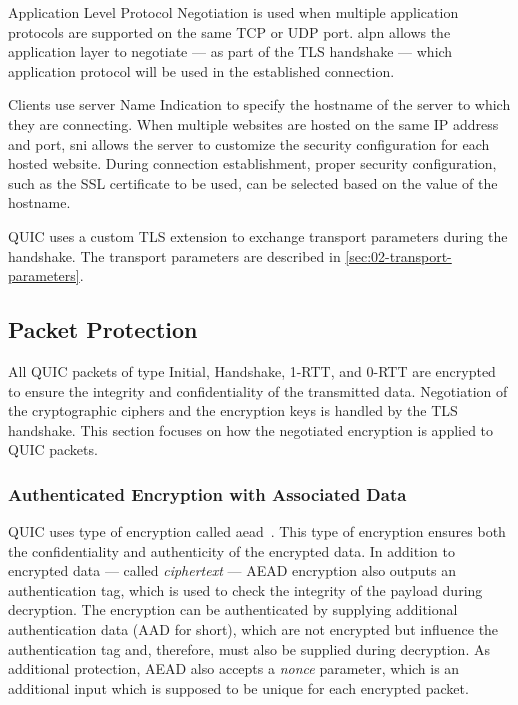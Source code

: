 Application Level Protocol Negotiation is used when multiple application protocols are supported on
the same TCP or UDP port. \Gls{alpn} allows the application layer to negotiate --- as part of the TLS
handshake --- which application protocol will be used in the established connection.

Clients use server Name Indication to specify the hostname of the server to which they are
connecting. When multiple websites are hosted on the same IP address and port, \gls{sni} allows the
server to customize the security configuration for each hosted website. During connection
establishment, proper security configuration, such as the SSL certificate to be used, can be
selected based on the value of the hostname.

QUIC uses a custom TLS extension to exchange transport parameters during the handshake. The
transport parameters are described in \autoref{sec:02-transport-parameters}.

\subsection{Packet Protection}\label{sec:02-packet-protection}

All QUIC packets of type Initial, Handshake, 1-RTT, and 0-RTT are encrypted to ensure the integrity
and confidentiality of the transmitted data. Negotiation of the cryptographic ciphers and the
encryption keys is handled by the TLS handshake. This section focuses on how the negotiated
encryption is applied to QUIC packets.

\subsubsection{Authenticated Encryption with Associated Data}

QUIC uses type of encryption called \gls{aead}~\cite{rfc5116}. This type of encryption ensures both
the confidentiality and authenticity of the encrypted data. In addition to encrypted data --- called
\textit{ciphertext} --- AEAD encryption also outputs an authentication tag, which is used to check
the integrity of the payload during decryption. The encryption can be authenticated by supplying
additional authentication data (AAD for short), which are not encrypted but influence the
authentication tag and, therefore, must also be supplied during decryption. As additional
protection, AEAD also accepts a \textit{nonce} parameter, which is an additional input which is
supposed to be unique for each encrypted packet.

